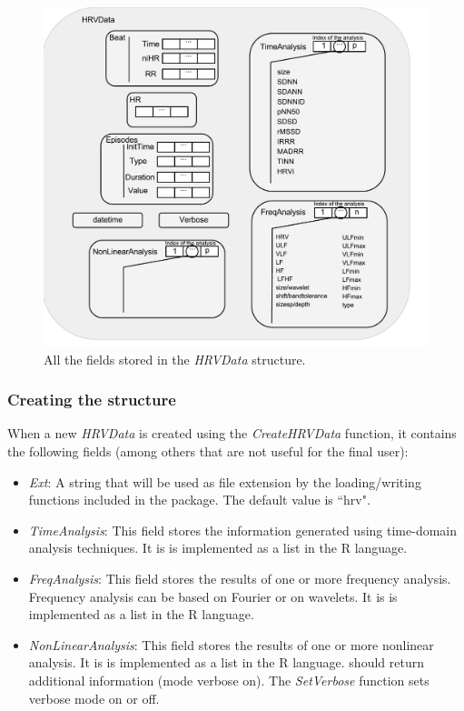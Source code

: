 \documentclass[12pt,lot, lof]{puthesis}
\begin{document}
\begin{figure}[h]
\centering
\includegraphics{figures/completeHRVData.pdf}
\caption{All the fields stored in the \textit{HRVData} 
structure.\label{fig:completeData}}
\end{figure}
\subsubsection{Creating the structure}
When a new \textit{HRVData} is created using the \textit{CreateHRVData} 
function, it contains the  following fields (among others that are not useful 
for the final user):
\begin{itemize}
\item \textit{Ext}: A string that will be used as file extension by the 
loading/writing functions included in the package. The default value is ``hrv".
\item \textit{TimeAnalysis}: This field stores the information generated using 
time-domain analysis techniques. It is is implemented as a list in the R 
language.
\item \textit{FreqAnalysis}: This field stores the  results of one or more 
frequency analysis. Frequency analysis can be based on Fourier or on wavelets. 
It is is implemented as a list in the R language.
\item \textit{NonLinearAnalysis}: This field stores the  results of one or more 
nonlinear analysis. It is is implemented as a list in the R language.
should return additional information (mode verbose on). The \textit{SetVerbose} 
function sets verbose mode on or off.
\end{itemize}
\end{document}
